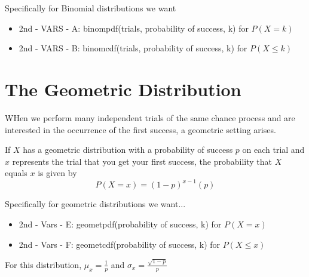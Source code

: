 \documentclass[../stats.tex]{subfiles}
\begin{document}
Specifically for Binomial distributions we want 
\begin{itemize}
    \item 2nd - VARS - A: binompdf(trials, probability of success, k) for $P(X=k)$
    \item 2nd - VARS - B: binomcdf(trials, probability of success, k) for $P(X\leq k)$
\end{itemize}
\section{The Geometric Distribution}
WHen we perform many independent trials of the same chance process and are interested in the occurrence of the first success, a geometric setting arises.

If $X$ has a geometric distribution with a probability of success $p$ on each trial and $x$ represents the trial that you get your first success, the probability that 
$X$ equals $x$ is given by 
\[ P(X=x) = (1-p)^{x-1}(p) \]

Specifically for geometric distributions we want... 
\begin{itemize}
    \item 2nd - Vars - E: geometpdf(probability of success, k) for $P(X=x)$
    \item 2nd - Vars - F: geometcdf(probability of success, k) for $P(X\leq x)$
\end{itemize}
For this distribution, $\mu_x = \frac{1}{p}$ and $\sigma_x = \frac{\sqrt{1-p}}{p}$
\end{document}
